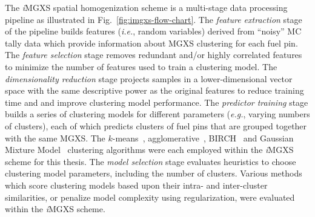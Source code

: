 \documentclass[12pt,twoside]{mitthesis-exec}
\begin{document}
The \textit{i}MGXS spatial homogenization scheme is a multi-stage data processing pipeline as illustrated in Fig.~\ref{fig:imgxs-flow-chart}. The \textit{feature extraction} stage of the pipeline builds features (\textit{i.e.}, random variables) derived from ``noisy'' MC tally data which provide information about MGXS clustering for each fuel pin. The \textit{feature selection} stage removes redundant and/or highly correlated features to minimize the number of features used to train a clustering model. The \textit{dimensionality reduction} stage projects samples in a lower-dimensional vector space with the same descriptive power as the original features to reduce training time and and improve clustering model performance. The \textit{predictor training} stage builds a series of clustering models for different parameters (\textit{e.g.}, varying numbers of clusters), each of which predicts clusters of fuel pins that are grouped together with the same MGXS. The $k$-means~\cite{macqueen1967kmeans, lloyd1982kmeans}, agglomerative~\cite{johnson1967hierarchical}, BIRCH~\cite{zhang1996birch} and Gaussian Mixture Model~\cite{mclachlan1988mixture} clustering algorithms were each employed within the \textit{i}MGXS scheme for this thesis. The \textit{model selection} stage evaluates heuristics to choose clustering model parameters, including the number of clusters. Various methods which score clustering models based upon their intra- and inter-cluster similarities, or penalize model complexity using regularization, were evaluated within the \textit{i}MGXS scheme.
\end{document}
